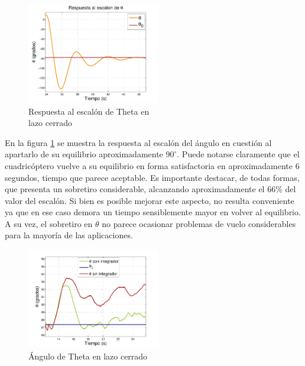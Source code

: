 \documentclass[main]{subfiles}
\begin{document}
\begin{figure}
	\vspace{-10pt}
	\centering
	\includegraphics[width=0.52\textwidth]{./pics_test_control/theta_esc.pdf}
	\caption{Respuesta al escal\'on de Theta en\\ lazo cerrado}
	\label{fig:theta_esc}
\end{figure}

En la figura \ref{fig:theta_esc} se muestra la respuesta al escalón del ángulo en cuestión al apartarlo de su equilibrio aproximadamente $90^\circ$. Puede notarse claramente que el cuadricóptero vuelve a su equilibrio en forma satisfactoria en aproximadamente 6 segundos, tiempo que parece aceptable. Es importante destacar, de todas formas, que presenta un sobretiro considerable, alcanzando aproximadamente el 66\% del valor del escalón. Si bien es posible mejorar este aspecto, no resulta conveniente ya que en ese caso demora un tiempo sensiblemente mayor en volver al equilibrio. A su vez, el sobretiro en $\theta$ no parece ocasionar problemas de vuelo considerables para la mayoría de las aplicaciones.\\

\begin{figure}
	\centering
	\vspace{-10pt}
	\includegraphics[width=0.52\textwidth]{./pics_test_control/theta_sin_con_int.pdf}
	\caption{\'Angulo de Theta en lazo cerrado}
	\vspace{-20pt}
	\label{fig:theta_sin_con_int}
\end{figure}
\end{document}
